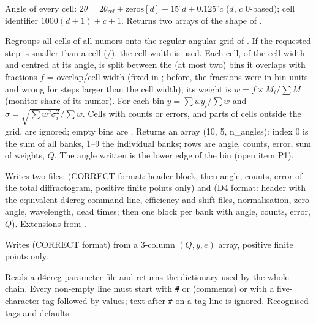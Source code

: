 \documentclass[11pt,a4paper]{article}
\begin{document}
Angle of every cell: $2\theta = 2\theta_\mathrm{ref} + \mathrm{zeros}[d] + 15^\circ d + 0.125^\circ c$
($d$, $c$ 0-based); cell identifier $1000(d+1) + c + 1$. Returns two
arrays of the shape of .


 
Regroups all cells of all numors onto the regular angular grid
 of . If
the requested step is smaller than a cell
(/), the cell width is used. Each cell,
of the cell width and centred at its angle, is split between the (at
most two) bins it overlaps with fractions $f$ = overlap/cell width (fixed
in ; before, the fractions were in bin units and wrong for
steps larger than the cell width); its weight is $w = f\times
M_i/\sum M$ (monitor share of its numor). For each bin
$y = \sum w y_i/\sum w$ and $\sigma = \sqrt{\sum w^2\sigma_i^2}/\sum w$.
Cells with  counts or errors, and parts of cells outside the grid,
are ignored; empty bins are . Returns an array (10, 5, n\_angles):
index 0 is the sum of all banks, 1--9 the individual banks; rows are angle,
counts, error, sum of weights, $Q$. The angle written is the lower edge of
the bin (open item P1).

Writes two files:  (CORRECT format: header block, then
angle, counts, error of the total diffractogram, positive finite points
only) and  (D4 format: header with the equivalent d4creg
command line, efficiency and shift files, normalisation, zero angle,
wavelength, dead times; then one block per bank with angle, counts, error,
$Q$). Extensions from .

Writes  (CORRECT format) from a 3-column $(Q, y, e)$
array, positive finite points only.


 
Reads a d4creg parameter file and returns the dictionary 
used by the whole chain. Every non-empty line must start with \texttt{\#} or
\code{!} (comments) or with a five-character tag  followed by
values; text after \texttt{\#} on a tag line is ignored. Recognised tags and
defaults:
\end{document}
